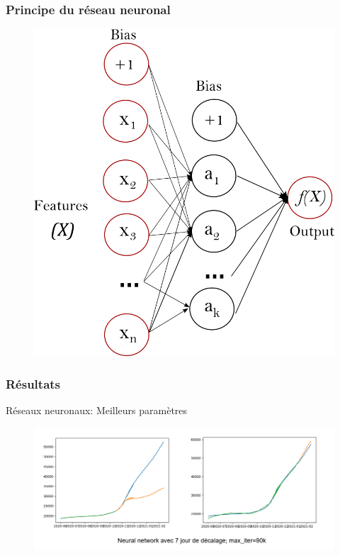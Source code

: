\documentclass{beamer}
\begin{document}
\begin{frame}
	\frametitle{Principe du réseau neuronal}
	\begin{figure}[t]
		\centering
		\begin{minipage}{0.5\textwidth}
			\includegraphics[scale=0.2]{nn_sk}
		\end{minipage}
	\end{figure}
\end{frame}

\begin{frame}
	\frametitle{Résultats}
	Réseaux neuronaux: Meilleurs paramètres
	\begin{figure}
		\includegraphics[scale=0.6]{NN_3}
	\end{figure}
\end{frame}
\end{document}
